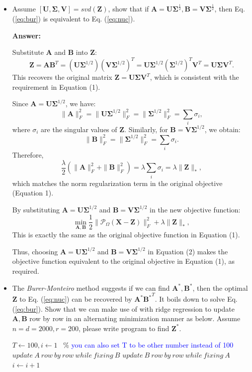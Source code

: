\documentclass[11pt]{article}
\newcommand{\mtx}[1]{\mathbf{#1}}
\def \mA {\mtx{A}}
\def \mB {\mtx{B}}
\def \mU {\mtx{U}}
\def \mV {\mtx{V}}
\def \mSigma {\mtx{\Sigma}}
\def \mZ {\mtx{Z}}
\begin{document}
\begin{itemize}
	\item Assume $[\mU,\mSigma,\mV]=svd(\mZ)$, show that if $\mA=\mU\mSigma^\frac{1}{2}, \mB=\mV\mSigma^\frac{1}{2}$, then Eq. (\ref{eq:bur}) is equivalent to Eq. (\ref{eq:nuc}).
	
	\textbf{Answer:}

		Substitute \( \mathbf{A} \) and \( \mathbf{B} \) into \( \mathbf{Z} \):
		\[
		\mathbf{Z} = \mathbf{A} \mathbf{B}^T = (\mathbf{U} \mathbf{\Sigma}^{1/2})(\mathbf{V} \mathbf{\Sigma}^{1/2})^T = \mathbf{U} \mathbf{\Sigma}^{1/2} (\mathbf{\Sigma}^{1/2})^T \mathbf{V}^T = \mathbf{U} \mathbf{\Sigma} \mathbf{V}^T.
		\]
		This recovers the original matrix \( \mathbf{Z} = \mathbf{U} \mathbf{\Sigma} \mathbf{V}^T \), which is consistent with the requirement in Equation (1).

		Since \( \mathbf{A} = \mathbf{U} \mathbf{\Sigma}^{1/2} \), we have:
		\[
		\| \mathbf{A} \|_F^2 = \| \mathbf{U} \mathbf{\Sigma}^{1/2} \|_F^2 = \| \mathbf{\Sigma}^{1/2} \|_F^2 = \sum_{i} \sigma_i,
		\]
		where \( \sigma_i \) are the singular values of \( \mathbf{Z} \). Similarly, for \( \mathbf{B} = \mathbf{V} \mathbf{\Sigma}^{1/2} \), we obtain:
		\[
		\| \mathbf{B} \|_F^2 = \| \mathbf{\Sigma}^{1/2} \|_F^2 = \sum_{i} \sigma_i.
		\]
		Therefore,
		\[
		\frac{\lambda}{2} \left( \| \mathbf{A} \|_F^2 + \| \mathbf{B} \|_F^2 \right) = \lambda \sum_{i} \sigma_i = \lambda \| \mathbf{Z} \|_*,
		\]
		which matches the norm regularization term in the original objective (Equation 1).

		By substituting \( \mathbf{A} = \mathbf{U} \mathbf{\Sigma}^{1/2} \) and \( \mathbf{B} = \mathbf{V} \mathbf{\Sigma}^{1/2} \) in the new objective function:
		\[
		\min_{\mathbf{A}, \mathbf{B}} \frac{1}{2} \| \mathcal{P}_{\Omega}(\mathbf{X} - \mathbf{Z}) \|_F^2 + \lambda \| \mathbf{Z} \|_*,
		\]
		This is exactly the same as the original objective function in Equation (1).

		Thus, choosing \( \mathbf{A} = \mathbf{U} \mathbf{\Sigma}^{1/2} \) and \( \mathbf{B} = \mathbf{V} \mathbf{\Sigma}^{1/2} \) in Equation (2) makes the objective function equivalent to the original objective in Equation (1), as required.
		\item The \textit{Burer-Monteiro} method suggests if we can find  $\mA^*,\mB^*$, then the optimal $\mZ$ to Eq. (\ref{eq:nuc}) can be recovered by $\mA^*{\mB^*}^T$. It boils down to solve Eq. (\ref{eq:bur}). Show that we can make use of  with ridge regression to update $\mA, \mB$ row by row in an alternating minimization manner as below. Assume $n=d=2000, r=200$, please write program to find $\mZ^*$.
	\begin{algorithmic}
		\State $T \gets 100, i\gets 1$ \ \% \textcolor{blue}{you can also set T to be other number instead of 100}
			\State $update \ A \ row \ by \ row \ while \ fixing \ B$
			\State $update \ B \ row \ by \ row \ while \ fixing \ A$
			\State $i \gets i+1$
		\EndIf 
	\end{algorithmic}
	\end{itemize}
\end{document}
